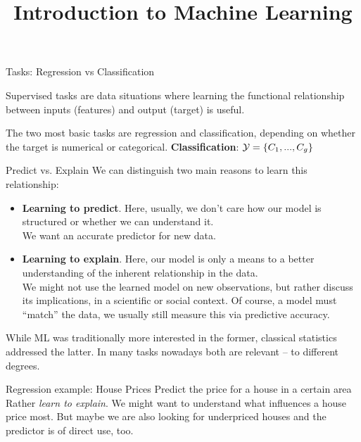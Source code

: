 \documentclass[11pt,compress,t,notes=noshow, xcolor=table]{beamer}
\title{Introduction to Machine Learning}
\begin{document}


\begin{framei}{Tasks: Regression vs Classification}
\item Supervised tasks are data situations where learning the functional relationship between inputs (features) and output (target) is useful.
\item The two most basic tasks are regression and classification, depending on whether the target is numerical or categorical.
\vfill
{}
{
\textbf{Classification}: $\mathcal{Y} = \{C_1,...,C_g\}$
}
\end{framei}


\begin{frame2}{Predict vs. Explain}
We can distinguish two main reasons to learn this relationship:
\begin{itemize}
  \item \textbf{Learning to predict}. Here, usually, we don't care how our model is structured or whether we can understand it.\\
  We want an accurate predictor for new data.
  \item \textbf{Learning to explain}. Here, our model is only a means to a better understanding of the inherent relationship in the data.\\
  We might not use the learned model on new observations, but rather discuss its implications, in a scientific or social context.
  Of course, a model must ``match'' the data, we usually still measure this via predictive accuracy. 
\end{itemize}  
\vfill
While ML was traditionally more interested in the former, classical statistics
addressed the latter. In many tasks nowadays both are relevant -- to different degrees.
\end{frame2}


\begin{frame2}{Regression example: House Prices}
Predict the price for a house in a certain area
\vfill
{} %
\vfill
{} %
\vfill
Rather \textit{learn to explain}. We might want to understand what influences a house price most.
But maybe we are also looking for underpriced houses and the predictor is of direct use, too.
\end{frame2}
\end{document}

